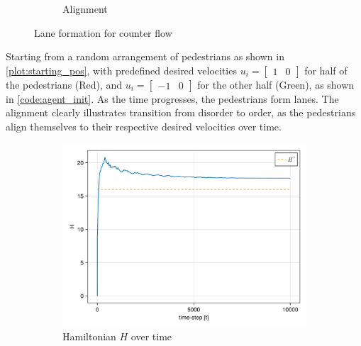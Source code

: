 \begin{itemize}
\begin{figure}[H]
\begin{subfigure}{.49\textwidth}
            \caption{Alignment}
            \label{plot:counter_alignment}
        \end{subfigure}
        \caption{Lane formation for counter flow}
        \label{plot:counter}
    \end{figure}
Starting from a random arrangement of pedestrians as shown in \autoref{plot:starting_pos}, with predefined desired velocities $u_i = \begin{bmatrix} 1 & 0 \end{bmatrix}$ for half of the pedestrians (Red), and $u_i = \begin{bmatrix} -1 & 0 \end{bmatrix}$ for the other half (Green), as shown in \autoref{code:agent_init}. As the time progresses, the pedestrians form lanes. The alignment clearly illustrates transition from disorder to order, as the pedestrians align themselves to their respective desired velocities over time.
    \begin{figure}[H]
        \centering
        \begin{subfigure}{.49\textwidth}
            \centering
            \includegraphics[width=\linewidth]{figures/ch5_collective/H_counter.png}
            \caption{Hamiltonian $H$ over time}
            \label{plot:counter_h}
        \end{subfigure}
        \begin{subfigure}{.49\textwidth}
            \centering

\end{subfigure}
\end{figure}
\end{itemize}
